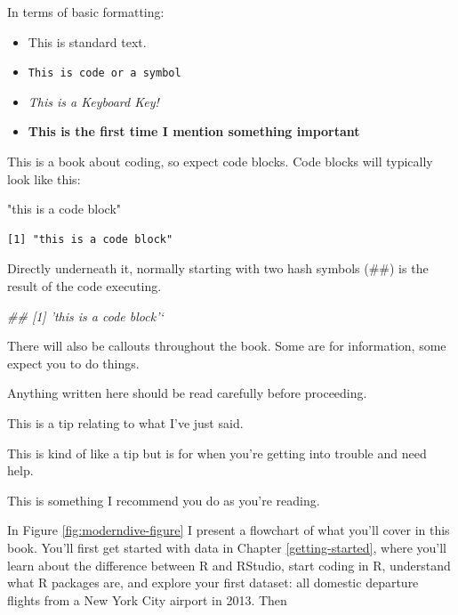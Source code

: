 \documentclass[
  12pt, krantz2,
]{krantz}
\makeatletter
\newenvironment{Shaded}{\begin{snugshade}}{\end{snugshade}}
\newcommand{\CommentTok}[1]{\textcolor[rgb]{0.37,0.37,0.37}{\textit{#1}}}
\newcommand{\StringTok}[1]{\textcolor[rgb]{0.5,0.5,0.5}{#1}}
\providecommand{\tightlist}{%
  \setlength{\itemsep}{0pt}\setlength{\parskip}{0pt}}
\newenvironment{kframe}{%
\medskip{}
\setlength{\fboxsep}{.8em}
 \def\at@end@of@kframe{}%
 \ifinner\ifhmode%
  \def\at@end@of@kframe{\end{minipage}}%
  \begin{minipage}{\columnwidth}%
 \fi\fi%
 \def\FrameCommand##1{\hskip\@totalleftmargin \hskip-\fboxsep
 \colorbox{shadecolor}{##1}\hskip-\fboxsep
     \hskip-\linewidth \hskip-\@totalleftmargin \hskip\columnwidth}%
 \MakeFramed {\advance\hsize-\width
   \@totalleftmargin\z@ \linewidth\hsize
   \@setminipage}}%
 {\par\unskip\endMakeFramed%
 \at@end@of@kframe}
\renewenvironment{Shaded}{\begin{kframe}}{\end{kframe}}
\makeatother
\begin{document}
In terms of basic formatting:

\begin{itemize}
\tightlist
\item
  This is standard text.
\item
  \texttt{This\ is\ code\ or\ a\ symbol}
\item
  \emph{This is a Keyboard Key!}
\item
  \textbf{This is the first time I mention something important}
\end{itemize}

This is a book about coding, so expect code blocks. Code blocks will typically look like this:

\begin{Shaded}
\begin{Highlighting}[]
\StringTok{"this is a code block"}
\end{Highlighting}
\end{Shaded}

\begin{verbatim}
[1] "this is a code block"
\end{verbatim}

Directly underneath it, normally starting with two hash symbols (\#\#) is the result of the code executing.

\begin{Shaded}
\begin{Highlighting}[]
\CommentTok{## [1] 'this is a code block'`}
\end{Highlighting}
\end{Shaded}

There will also be callouts throughout the book. Some are for information, some expect you to do things.

Anything written here should be read carefully before proceeding.

This is a tip relating to what I've just said.

This is kind of like a tip but is for when you're getting into trouble and need help.

This is something I recommend you do as you're reading.

In Figure \ref{fig:moderndive-figure} I present a flowchart of what you'll cover in this book. You'll first get started with data in Chapter \ref{getting-started}, where you'll learn about the difference between R and RStudio, start coding in R, understand what R packages are, and explore your first dataset: all domestic departure flights from a New York City airport in 2013. Then
\end{document}
